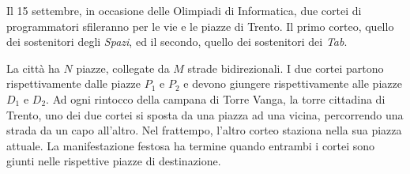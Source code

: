 \usepackage{xcolor}
\usepackage{afterpage}
\usepackage{pifont,mdframed}
\usepackage[bottom]{footmisc}



\renewcommand{\inputfile}{\texttt{stdin}}
\renewcommand{\outputfile}{\texttt{stdout}}
\makeatletter
\renewcommand{\this@inputfilename}{\texttt{stdin}}
\renewcommand{\this@outputfilename}{\texttt{stdout}}
\makeatother

\newenvironment{warning}
  {\par\begin{mdframed}[linewidth=2pt,linecolor=gray]%
    \begin{list}{}{\leftmargin=1cm
                   \labelwidth=\leftmargin}\item[\Large\ding{43}]}
  {\end{list}\end{mdframed}\par}

\newenvironment{todoenv}
{\par\begin{mdframed}[linewidth=2pt,linecolor=red]%
		\begin{list}{}{\leftmargin=1cm
				\labelwidth=\leftmargin}\item[\Large\ding{169}]}
		{\end{list}\end{mdframed}\par}

\newcommand{\todo}[1]{\begin{todoenv}
		TODO: #1
\end{todoenv}}



Il 15 settembre, in occasione delle Olimpiadi di Informatica, due cortei di programmatori sfileranno per le vie e le piazze di Trento.
Il primo corteo, quello dei sostenitori degli \emph{Spazi}, ed il secondo, quello dei sostenitori dei \emph{Tab}.

La città ha $N$ piazze, collegate da $M$ strade bidirezionali.
I due cortei partono rispettivamente dalle piazze $P_1$ e $P_2$ e devono giungere rispettivamente alle piazze $D_1$ e $D_2$.
Ad ogni rintocco della campana di Torre Vanga, la torre cittadina di Trento,
uno dei due cortei si sposta da una piazza ad una vicina, percorrendo una strada da un capo all'altro.
Nel frattempo, l'altro corteo staziona nella sua piazza attuale.
La manifestazione festosa ha termine quando entrambi i cortei sono giunti nelle rispettive piazze di destinazione.

